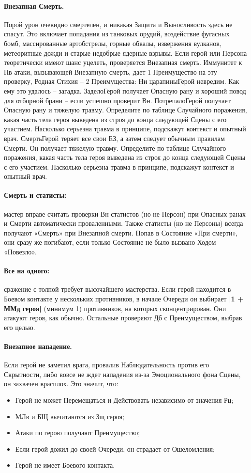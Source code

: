 \paragraph{Внезапная Смерть.} Порой урон очевидно смертелен, и никакая Защита и Выносливость здесь не спасут. Это включает попадания из танковых орудий, воздействие фугасных бомб, массированные артобстрелы, горные обвалы, извержения вулканов, метеоритные дожди и старые недобрые ядерные взрывы.
\newline Если герой или Персона теоретически имеют шанс уцелеть, проверяется  Внезапная смерть. Иммунитет к Пв атаки, вызывающей Внезапную смерть, дает 1 Преимущество на эту проверку, Родная Стихия – 2 Преимущества:
\trouble
{Ни царапины}{Герой невредим. Как ему это удалось – загадка.}
{Задело}{Герой получает Опасную рану и хороший повод для отборной брани – если успешно проверит Вн.}
{Потрепало}{Герой получает Опасную рану и тяжелую травму. Определите по таблице Случайного поражения, какая часть тела героя выведена из строя до конца следующей Сцены с его участием. Насколько серьезна травма в принципе, подскажут контекст и опытный врач.}
{Смерть}{Герой теряет все свои ЕЗ, а затем следует обычным правилам Смерти. Он получает тяжелую травму. Определите по таблице Случайного поражения, какая часть тела героя выведена из строя до конца следующей Сцены с его участием. Насколько серьезна травма в принципе, подскажут контекст и опытный врач.}
\paragraph{Смерть и статисты:} мастер вправе считать проверки Вн статистов (но не Персон) при Опасных ранах и Смерти автоматически проваленными. Также статисты (но не Персоны) всегда получают «Смерть» при Внезапной смерти. Попав в Состояние «При смерти», они сразу же погибают, если только Состояние не было вызвано Ходом «Повезло».
\paragraph{Все на одного:} сражение с толпой требует высочайшего мастерства. Если герой находится в Боевом контакте у нескольких противников, в начале Очереди он выбирает \textbf{|1 + ММд героя|} (минимум 1) противников, на которых сконцентрирован. Они атакуют героя, как обычно. Остальные проверяют Дб с Преимуществом, выбрав его целью.
\paragraph{Внезапное нападение.} Если герой не заметил врага, провалив Наблюдательность против его Скрытности, либо вовсе не ждет нападения из-за Эмоционального фона Сцены, он захвачен врасплох. Это значит, что:
\begin{itemize}
  \item Герой не может Перемещаться и Действовать независимо от значения Рц;
  \item МЛв и БЩ вычитаются из Зщ героя;
  \item Атаки по герою получают Преимущество;
  \item Если герой дожил до своей Очереди, он страдает от Ошеломления;
  \item Герой не имеет Боевого контакта.
\end{itemize}
